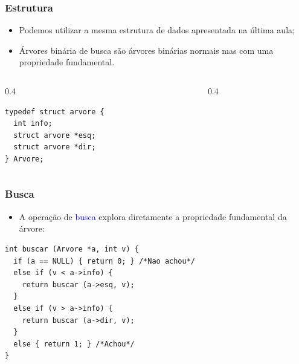 \documentclass{beamer}
\newcommand{\tcb}[1]{\textcolor{blue}{#1}}
\begin{document}
\begin{frame}[fragile]
  \frametitle{Estrutura}

  \begin{itemize}
    \item Podemos utilizar a mesma estrutura de dados  apresentada na última aula;
    \item Árvores binária de busca são árvores binárias normais mas com uma propriedade fundamental.
  \end{itemize}

  \begin{columns}
    \begin{column}{0.4\textwidth}
      \begin{verbatim}
typedef struct arvore {
  int info;
  struct arvore *esq;
  struct arvore *dir;
} Arvore;
      \end{verbatim}
    \end{column}
    \begin{column}{0.4\textwidth}
      \centering
    \end{column}
  \end{columns}
  
\end{frame}

\begin{frame}[fragile]
  \frametitle{Busca}

  \begin{itemize}
    \item A operação de \tcb{busca} explora diretamente a propriedade fundamental da árvore:
  \end{itemize}
  
  \begin{verbatim}
int buscar (Arvore *a, int v) {
  if (a == NULL) { return 0; } /*Nao achou*/
  else if (v < a->info) {
    return buscar (a->esq, v);
  }
  else if (v > a->info) {
    return buscar (a->dir, v);
  }
  else { return 1; } /*Achou*/
}
  \end{verbatim}

\end{frame}
\end{document}
